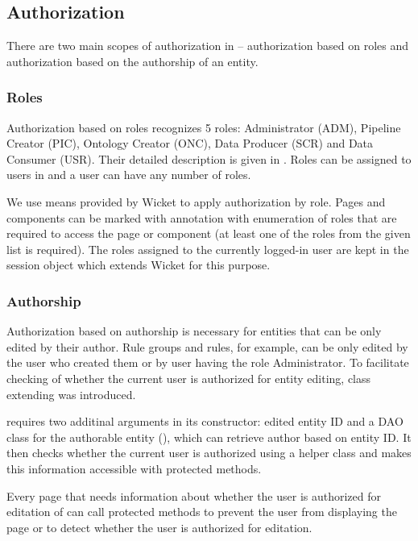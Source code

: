 \subsection{Authorization}
There are two main scopes of authorization in \odcs -- authorization based on roles and authorization based on the authorship of an entity.

\subsubsection{Roles}
Authorization based on roles recognizes 5 roles: Administrator (ADM), Pipeline Creator (PIC), Ontology Creator (ONC), Data Producer (SCR) and Data Consumer (USR). Their detailed description is given in . Roles can be assigned to users in \FE and a user can have any number of roles.

We use means provided by Wicket to apply authorization by role. Pages and components can be marked with  annotation with enumeration of roles that are required to access the page or component (at least one of the roles from the given list is required). The roles assigned to the currently logged-in user are kept in the session object  which extends Wicket  for this purpose.

\subsubsection{Authorship}
\label{sec:authorshipAuth}
Authorization based on authorship is necessary for entities that can be only edited by their author. Rule groups and rules, for example, can be only edited by the user who created them or by user having the role Administrator. To facilitate checking of whether the current user is authorized for entity editing, class  extending  was introduced.

 requires two additinal arguments in its constructor: edited entity ID and a DAO class for the authorable entity (), which can retrieve author based on entity ID. It then checks whether the current user is authorized using a helper class  and makes this information accessible with protected methods.

Every page that needs information about whether the user is authorized for editation of can call protected methods  to prevent the user from displaying the page or  to detect whether the user is authorized for editation.

